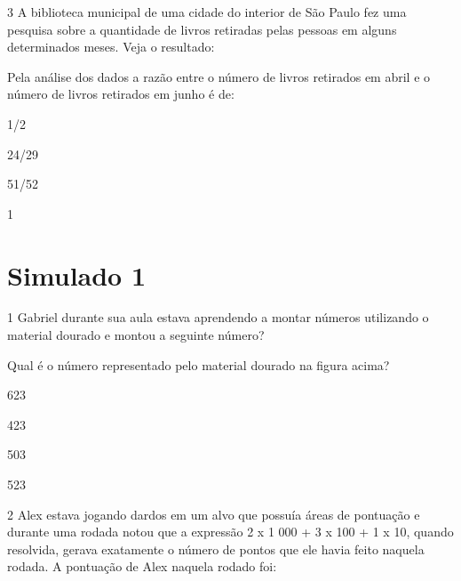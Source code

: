 
\num{3} A biblioteca municipal de uma cidade do interior de São Paulo fez
uma pesquisa sobre a quantidade de livros retiradas pelas pessoas em
alguns determinados meses. Veja o resultado:


Pela análise dos dados a razão entre o número de livros retirados em
abril e o número de livros retirados em junho é de:

\begin{escolha}
\item
  1/2
\item
  24/29
\item
  51/52
\item
  1
\end{escolha}


\chapter{Simulado 1}

\num{1} Gabriel durante sua aula estava aprendendo a montar números
utilizando o material dourado e montou a seguinte número?


Qual é o número representado pelo material dourado na figura acima?

\begin{escolha}
\item
  623
\item
  423
\item
  503
\item
  523
\end{escolha}


\num{2} Alex estava jogando dardos em um alvo que possuía áreas de
pontuação e durante uma rodada notou que a expressão 2 x 1 000 + 3 x 100
+ 1 x 10, quando resolvida, gerava exatamente o número de pontos que ele
havia feito naquela rodada. A pontuação de Alex naquela rodado foi:

